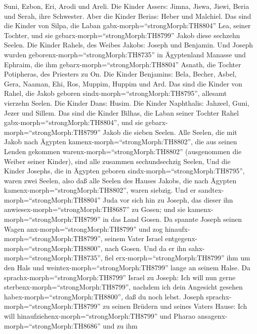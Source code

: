 Suni, Ezbon, Eri, Arodi und Areli.  Die Kinder Assers:
Jimna, Jiswa, Jiswi, Beria und Serah, ihre Schwester. Aber die Kinder
Berias: Heber und Malchiel.  Das sind die Kinder von Silpa,
die Laban gabx-morph=``strongMorph:TH8804'' Lea, seiner Tochter, und sie
gebarx-morph=``strongMorph:TH8799'' Jakob diese sechzehn Seelen.
 Die Kinder Rahels, des Weibes Jakobs: Joseph und Benjamin.
 Und Joseph wurden geborenx-morph=``strongMorph:TH8735'' in
Ägyptenland Manasse und Ephraim, die ihm
gebarx-morph=``strongMorph:TH8804'' Asnath, die Tochter Potipheras, des
Priesters zu On.  Die Kinder Benjamins: Bela, Becher,
Asbel, Gera, Naaman, Ehi, Ros, Muppim, Huppim und Ard.  Das
sind die Kinder von Rahel, die Jakob geboren
sindx-morph=``strongMorph:TH8795'', allesamt vierzehn Seelen.
 Die Kinder Dans: Husim.  Die Kinder
Naphthalis: Jahzeel, Guni, Jezer und Sillem.  Das sind die
Kinder Bilhas, die Laban seiner Tochter Rahel
gabx-morph=``strongMorph:TH8804'', und sie
gebarx-morph=``strongMorph:TH8799'' Jakob die sieben Seelen.
 Alle Seelen, die mit Jakob nach Ägypten
kamenx-morph=``strongMorph:TH8802'', die aus seinen Lenden gekommen
warenx-morph=``strongMorph:TH8802'' (ausgenommen die Weiber seiner
Kinder), sind alle zusammen sechundsechzig Seelen,  Und die
Kinder Josephs, die in Ägypten geboren
sindx-morph=``strongMorph:TH8795'', waren zwei Seelen, also daß alle
Seelen des Hauses Jakobs, die nach Ägypten
kamenx-morph=``strongMorph:TH8802'', waren siebzig.  Und er
sandtex-morph=``strongMorph:TH8804'' Juda vor sich hin zu Joseph, das
dieser ihn anwiesex-morph=``strongMorph:TH8687'' zu Gosen; und sie
kamenx-morph=``strongMorph:TH8799'' in das Land Gosen.  Da
spannte Joseph seinen Wagen anx-morph=``strongMorph:TH8799'' und zog
hinaufx-morph=``strongMorph:TH8799'', seinem Vater Israel
entgegenx-morph=``strongMorph:TH8800'', nach Gosen. Und da er ihn
sahx-morph=``strongMorph:TH8735'', fiel erx-morph=``strongMorph:TH8799''
ihm um den Hals und weintex-morph=``strongMorph:TH8799'' lange an seinem
Halse.  Da sprachx-morph=``strongMorph:TH8799'' Israel zu
Joseph: Ich will nun gerne sterbenx-morph=``strongMorph:TH8799'',
nachdem ich dein Angesicht gesehen habex-morph=``strongMorph:TH8800'',
daß du noch lebst.  Joseph
sprachx-morph=``strongMorph:TH8799'' zu seinen Brüdern und seines Vaters
Hause: Ich will hinaufziehenx-morph=``strongMorph:TH8799'' und Pharao
ansagenx-morph=``strongMorph:TH8686'' und zu ihm
